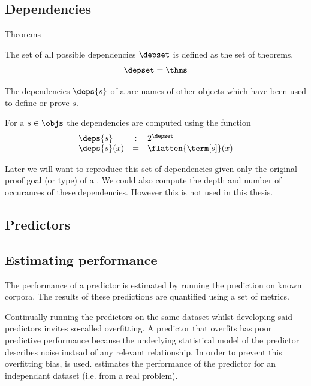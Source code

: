 \subsection{Dependencies}
\label{sections:deps}

Theorems
\begin{definition}\label{def:depset}
  The set of all possible dependencies $\depset$ is defined as the set of theorems.
  $$
  \depset = \thms
  $$
\end{definition}

The dependencies $\deps{s}$ of a \coqobj[s] are names of other objects which have been used to define or prove $s$.

\begin{definition}\label{def:deps}
  For a \coqobj $s \in \objs$ the dependencies are computed using the function
  $$
  \begin{array}{lcl}
    \deps{s} & : & 2^{\depset} \\
    \deps{s}(x) & = & \flatten{\term[s]}(x)
  \end{array}
  $$
\end{definition}

Later we will want to reproduce this set of dependencies given only the original proof goal (or type) of a \coqobj.
We could also compute the depth and number of occurances of these dependencies.
However this is not used in this thesis.

\subsection{Predictors}


\subsection{Estimating performance}
The performance of a predictor is estimated by running the prediction on known corpora.
The results of these predictions are quantified using a set of metrics.

Continually running the predictors on the same dataset whilst developing said predictors invites so-called overfitting.
A predictor that overfits has poor predictive performance because the underlying statistical model of the predictor describes noise instead of any relevant relationship.
In order to prevent this overfitting bias, \crossvalidation is used.
\crossvalidation estimates the performance of the predictor for an independant dataset (i.e. from a real problem).

